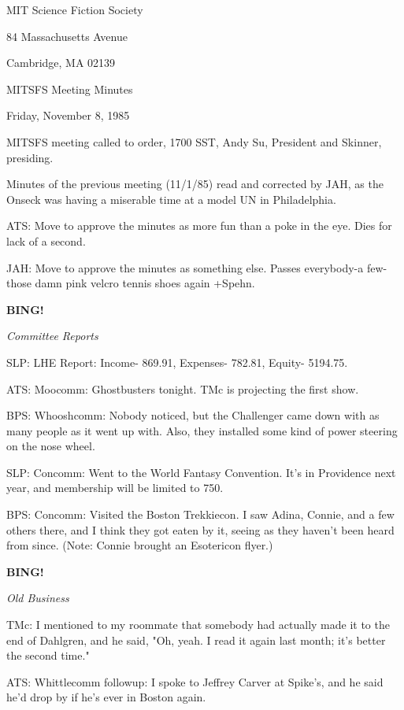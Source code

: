 \documentclass[12pt]{article}
\newcommand{\bing}{{\bf BING!} }
\newcommand{\goto}[1]{\bing \vskip 12pt \centerline{{\em{#1}}}}
\begin{document}
\begin{center}

MIT Science Fiction Society 

84 Massachusetts Avenue

Cambridge, MA 02139

\vspace{12pt}

MITSFS Meeting Minutes 

Friday, November 8, 1985

\end{center}
 
\vspace{18pt}

\setlength{\parskip}{6pt}

\noindent
MITSFS meeting called to order, 1700 SST,
Andy Su, President and Skinner, presiding.

Minutes of the previous meeting (11/1/85) read and corrected by JAH, as the Onseck was having a miserable time at a model UN in Philadelphia.

ATS: Move to approve the minutes as more fun than a poke in the eye. Dies for lack of a second.

JAH: Move to approve the minutes as something else. Passes everybody-a few-those damn pink velcro tennis shoes again +Spehn.

\goto{Committee Reports}

SLP: LHE Report: Income- 869.91, Expenses- 782.81, Equity- 5194.75.

ATS: Moocomm: Ghostbusters tonight. TMc is projecting the first show.

BPS: Whooshcomm: Nobody noticed, but the Challenger came down with as many people as it went up with. Also, they installed some kind of power steering on the nose wheel.

SLP: Concomm: Went to the World Fantasy Convention. It's in Providence next year, and membership will be limited to 750.

BPS: Concomm: Visited the Boston Trekkiecon. I saw Adina, Connie, and a few others there, and I think they got eaten by it, seeing as they haven't been heard from since. (Note: Connie brought an Esotericon flyer.)

\goto{Old Business}

TMc: I mentioned to my roommate that somebody had actually made it to the end of Dahlgren, and he said, "Oh, yeah. I read it again last month; it's better the second time."

ATS: Whittlecomm followup: I spoke to Jeffrey Carver at Spike's, and he said he'd drop by if he's ever in Boston again.
\end{document}
